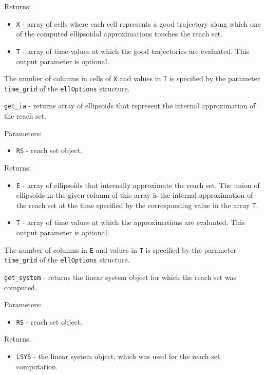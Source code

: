 \documentclass{report}
\begin{document}
Returns:
\begin{itemize}
\item {\tt X} - array of cells where each cell represents a good trajectory
along which one of the computed ellipsoidal approximations touches the
reach set.
\item {\tt T} - array of time values at which the good trajectories
are evaluated. This output parameter is optional.
\end{itemize}
The number of columns in cells of {\tt X} and values in {\tt T} is specified by
the parameter {\tt time\_grid} of the {\tt ellOptions} structure.

\newpage

{\Large {\tt get\_ia}} - returns array of ellipsoids that represent the
internal approximation of the reach set.

Parameters:
\begin{itemize}
\item {\tt RS} - reach set object.
\end{itemize}

Returns:
\begin{itemize}
\item {\tt E} - array of ellipsoids that internally approximate the reach set.
The union of ellipsoids in the given column of this array is
the internal approximation of the reach set at the time specified by the
corresponding value in the array {\tt T}.
\item {\tt T} - array of time values at which the approximations
are evaluated. This output parameter is optional.
\end{itemize}
The number of columns in {\tt E} and values in {\tt T} is specified by
the parameter {\tt time\_grid} of the {\tt ellOptions} structure.

\newpage

{\Large {\tt get\_system}} - returns the linear system object for which
the reach set was computed.

Parameters:
\begin{itemize}
\item {\tt RS} - reach set object.
\end{itemize}

Returns:
\begin{itemize}
\item {\tt LSYS} - the linear system object, which was used for the reach
set computation.
\end{itemize}

\newpage
\end{document}
